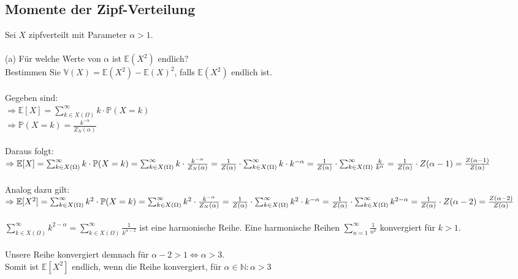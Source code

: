 \documentclass[a4paper]{article}
\begin{document}
\subsection{Momente der Zipf-Verteilung}
Sei $X$ zipfverteilt mit Parameter $\alpha >1$.\\\\
(a) Für welche Werte von $\alpha$ ist $\mathbb{E}(X^2)$ endlich?\\
Bestimmen Sie $\mathbb{V}(X) = \mathbb{E}(X^2)-\mathbb{E}(X)^2$, falls $\mathbb{E}(X^2)$ endlich ist.\\\\
Gegeben sind:\\
$\Rightarrow \mathbb{E}[X] = \sum_{k \in X(\Omega)}^{\infty} k \cdot \mathbb{P}(X = k)$\\
$\Rightarrow \mathbb{P}(X = k) = \frac{k^{-\alpha}}{Z_N(\alpha)}$\\\\
Daraus folgt:\\
$\Rightarrow \mathbb{E}[X] = \sum_{k \in X(\Omega)}^{\infty} k \cdot \mathbb{P}(X = k) = \sum_{k \in X(\Omega)}^{\infty} k \cdot \frac{k^{-\alpha}}{Z_N(\alpha)} = \frac{1}{Z(\alpha)} \cdot \sum_{k \in X(\Omega)}^{\infty} k \cdot k^{-\alpha}\\
= \frac{1}{Z(\alpha)} \cdot \sum_{k \in X(\Omega)}^{\infty} \frac{k}{k^\alpha} = \frac{1}{Z(\alpha)} \cdot Z(\alpha - 1) = \frac{Z(\alpha - 1)}{Z(\alpha)}$\\\\
Analog dazu gilt:\\
$\Rightarrow \mathbb{E}[X^2] = \sum_{k \in X(\Omega)}^{\infty} k^2 \cdot \mathbb{P}(X = k) = \sum_{k \in X(\Omega)}^{\infty} k^2 \cdot \frac{k^{-\alpha}}{Z_N(\alpha)} = \frac{1}{Z(\alpha)} \cdot \sum_{k \in X(\Omega)}^{\infty} k^2 \cdot k^{-\alpha}\\
= \frac{1}{Z(\alpha)} \cdot \sum_{k \in X(\Omega)}^{\infty}k^{2 -\alpha} = \frac{1}{Z(\alpha)} \cdot Z(\alpha - 2) = \frac{Z(\alpha - 2)}{Z(\alpha)}$\\\\
$\sum_{k \in X(\Omega)}^{\infty}k^{2 -\alpha} = \sum_{k \in X(\Omega)}^{\infty}\frac{1}{k^{\alpha - 2}}$ ist eine harmonische Reihe. Eine harmonische Reihen $\sum_{n = 1}^\infty \frac{1}{n^k}$ konvergiert für $k > 1$.\\\\
Unsere Reihe konvergiert demnach für $\alpha - 2 > 1 \Leftrightarrow \alpha > 3$.\\
Somit ist $\mathbb{E}[X^2]$ endlich, wenn die Reihe konvergiert, für $\alpha \in \mathbb{N}:\alpha > 3$\\\\
\end{document}
